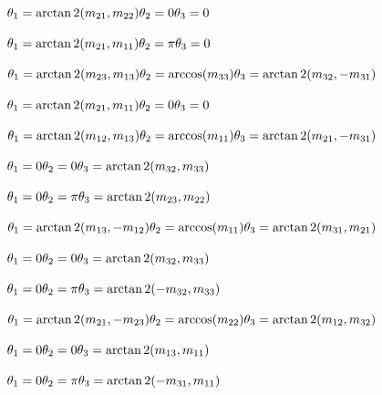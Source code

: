 \documentclass{article}
\begin{document}
$ \theta_1=\arctan2(m_{21},m_{22})\\ \theta_2=0\\ \theta_3=0 $
\pagebreak

$ \theta_1=\arctan2(m_{21},m_{11})\\ \theta_2=\pi\\ \theta_3=0 $
\pagebreak

$ \theta_1 = \arctan2(m_{23},m_{13})\\\theta_2 = \arccos(m_{33}) \\\theta_3 = \arctan2(m_{32},-m_{31}) $
\pagebreak

$ \theta_1=\arctan2(m_{21},m_{11})\\ \theta_2=0\\ \theta_3=0 $
\pagebreak

$ \theta_1 = \arctan2(m_{12},m_{13}) \\\theta_2 = \arccos(m_{11}) \\\theta_3 = \arctan2(m_{21},-m_{31})$
\pagebreak

$ \theta_1=0\\ \theta_2=0\\ \theta_3=\arctan2(m_{32},m_{33}) $
\pagebreak

$ \theta_1= 0\\ \theta_2=\pi\\ \theta_3= \arctan2(m_{23},m_{22}) $
\pagebreak

$ \theta_1 = \arctan2(m_{13},-m_{12})\\\theta_2 = \arccos(m_{11}) \\\theta_3 = \arctan2(m_{31},m_{21})$
\pagebreak

$ \theta_1= 0\\ \theta_2=0\\ \theta_3=\arctan2(m_{32},m_{33}) $
\pagebreak

$ \theta_1= 0\\ \theta_2=\pi\\ \theta_3=\arctan2(-m_{32},m_{33}) $
\pagebreak

$ \theta_1 = \arctan2(m_{21},-m_{23})\\\theta_2 = \arccos(m_{22}) \\\theta_3 = \arctan2(m_{12},m_{32}) $
\pagebreak

$ \theta_1= 0\\ \theta_2=0\\ \theta_3=\arctan2(m_{13},m_{11}) $
\pagebreak

$ \theta_1= 0\\ \theta_2=\pi\\ \theta_3=\arctan2(-m_{31},m_{11}) $
\pagebreak
\end{document}
